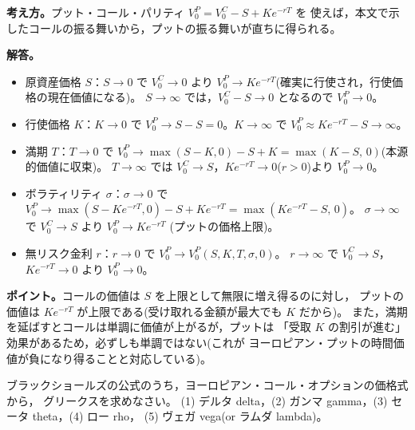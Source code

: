 \begin{answerbox}
\textbf{考え方。}プット・コール・パリティ $V_0^P = V_0^C - S + Ke^{-rT}$ を
使えば，本文で示したコールの振る舞いから，プットの振る舞いが直ちに得られる。

\medskip
\textbf{解答。}
\begin{itemize}
\item 原資産価格 $S$：$S\to 0$ で $V_0^C\to 0$ より
$V_0^P \to Ke^{-rT}$(確実に行使され，行使価格の現在価値になる)。
$S\to\infty$ では，$V_0^C - S \to 0$ となるので $V_0^P \to 0$。
\item 行使価格 $K$：$K\to 0$ で $V_0^P \to S - S = 0$。$K\to\infty$ で
$V_0^P \approx Ke^{-rT} - S \to \infty$。
\item 満期 $T$：$T\to 0$ で
$V_0^P \to \max(S-K,0) - S + K = \max(K-S,\,0)$(本源的価値に収束)。
$T\to\infty$ では $V_0^C\to S$，$Ke^{-rT}\to 0$($r>0$)より $V_0^P \to 0$。
\item ボラティリティ $\sigma$：$\sigma\to 0$ で
$V_0^P \to \max(S-Ke^{-rT},0) - S + Ke^{-rT} = \max(Ke^{-rT}-S,\,0)$。
$\sigma\to\infty$ で $V_0^C\to S$ より $V_0^P \to Ke^{-rT}$
(プットの価格上限)。
\item 無リスク金利 $r$：$r\to 0$ で $V_0^P \to V_0^P(S,K,T,\sigma,0)$。
$r\to\infty$ で $V_0^C\to S$，$Ke^{-rT}\to 0$ より $V_0^P\to 0$。
\end{itemize}

\medskip
\textbf{ポイント。}コールの価値は $S$ を上限として無限に増え得るのに対し，
プットの価値は $Ke^{-rT}$ が上限である(受け取れる金額が最大でも $K$ だから)。
また，満期を延ばすとコールは単調に価値が上がるが，プットは
「受取 $K$ の割引が進む」効果があるため，必ずしも単調ではない(これが
ヨーロピアン・プットの時間価値が負になり得ることと対応している)。
\end{answerbox}

\begin{exercise}[問題12-3]
ブラックショールズの公式のうち，ヨーロピアン・コール・オプションの価格式から，
グリークスを求めなさい。
(1) デルタ delta，(2) ガンマ gamma，(3) セータ theta，(4) ロー rho，
(5) ヴェガ vega(or ラムダ lambda)。
\end{exercise}

